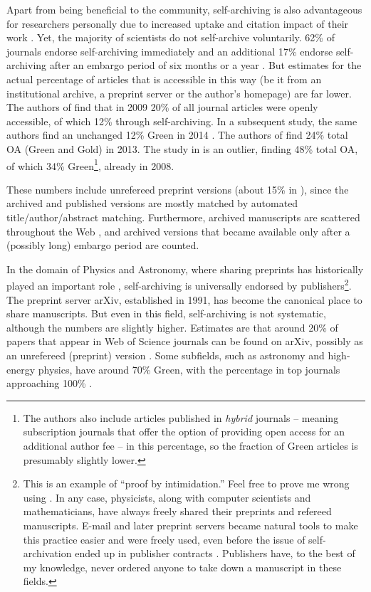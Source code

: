 \documentclass[11pt, openany, oneside, article, a4paper, twocolumn]{memoir}
\begin{document}
Apart from being beneficial to the community, self-archiving is also
advantageous for researchers personally due to increased uptake and
citation impact of their work \cite{gargouri2010self}. Yet, the majority
of scientists do not self-archive voluntarily. 62\% of journals endorse
self-archiving immediately and an additional 17\% endorse self-archiving
after an embargo period of six months or a year \cite{bjork2014anatomy}.
But estimates for the actual percentage of articles that is accessible in
this way (be it from an institutional archive, a preprint server or the
author's homepage) are far lower. The authors of \cite{bjork2010open} find
that in 2009 20\% of all journal articles were openly accessible, of which
12\% through self-archiving. In a subsequent study, the same authors find
an unchanged 12\% Green in 2014 \cite{bjork2014anatomy}. The authors of
\cite{khabsa2014number} find 24\% total OA (Green and Gold) in 2013. The
study in \cite{archambault2013tipping} is an outlier, finding 48\% total
OA, of which 34\% Green\footnote{The authors also include articles
published in \emph{hybrid} journals -- meaning subscription journals that
offer the option of providing open access for an additional author fee --
in this percentage, so the fraction of Green articles is presumably
slightly lower.}, already in 2008.

These numbers include unrefereed preprint versions (about 15\% in
\cite{bjork2014anatomy}), since the archived and published versions are
mostly matched by automated title/author/abstract matching. Furthermore,
archived manuscripts are scattered throughout the Web
\cite{kim2010faculty}, and archived versions that became available only
after a (possibly long) embargo period are counted.

In the domain of Physics and Astronomy, where sharing preprints has
historically played an important role \cite{brown2001evolution},
self-archiving is universally endorsed by publishers\footnote{This is an
example of \enquote{proof by intimidation.} Feel free to prove me wrong
using \cite{sherpa_romeo}. In any case, physicists, along with computer
scientists and mathematicians, have always freely shared their preprints
and refereed manuscripts. E-mail and later preprint servers became natural
tools to make this practice easier and were freely used, even before the
issue of self-archivation ended up in publisher contracts
\cite{brown2001evolution}. Publishers have, to the best of my knowledge,
never ordered anyone to take down a manuscript in these fields.}. The
preprint server arXiv, established in 1991, has become the canonical place
to share manuscripts. But even in this field, self-archiving is not
systematic, although the numbers are slightly higher. Estimates are that
around 20\% of papers that appear in Web of Science journals can be found
on arXiv, possibly as an unrefereed (preprint) version
\cite{bjork2010open, lariviere2014arxiv}. Some subfields, such as
astronomy and high-energy physics, have around 70\% Green, with the
percentage in top journals approaching 100\% \cite{gentil2010citinghep}.
\end{document}
